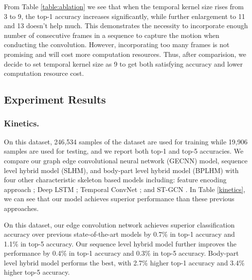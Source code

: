 \documentclass[a4paper,11pt]{article}
\begin{document}
From Table \ref{table:ablation} we see that when the temporal kernel size rises from 3 to 9, the top-1 accuracy increases significantly, while further enlargement to 11 and 13 doesn't help much. This demonstrates the necessity to incorporate enough number of consecutive frames in a sequence to capture the motion when conducting the convolution. However, incorporating too many frames is not promising and will cost more computation resources. Thus, after comparision, we decide to set temporal kernel size as 9 to get both satisfying accuracy and lower computation resource cost.




\subsection{Experiment Results}

\subsubsection{Kinetics.}
On this dataset, 246,534 samples of the dataset are used for training while 19,906 samples are used for testing, and we report both top-1 and top-5 accuracies.
We compare our graph edge convolutional neural network (GECNN) model, sequence level hybrid model (SLHM), and body-part level hybrid model (BPLHM) with four other characteristic skeleton based models including: feature encoding approach \cite{fernando2015modeling}; Deep LSTM \cite{shahroudy2016ntu}; Temporal ConvNet \cite{soo2017interpretable}; and ST-GCN \cite{yan2018spatial}. In Table \ref{kinetics}, we can see that our model achieves superior performance than these previous approaches.

On this dataset, our edge convolution network achieves superior classification accuracy over previous state-of-the-art models by 0.7\% in top-1 accuracy and 1.1\% in top-5 accuracy.
Our sequence level hybrid model further improves the performance by 0.4\% in top-1 accuracy and 0.3\% in top-5 accuracy. Body-part level hybrid model performs the best, with 2.7\% higher top-1 accuracy and 3.4\% higher top-5 accuracy.
\end{document}
